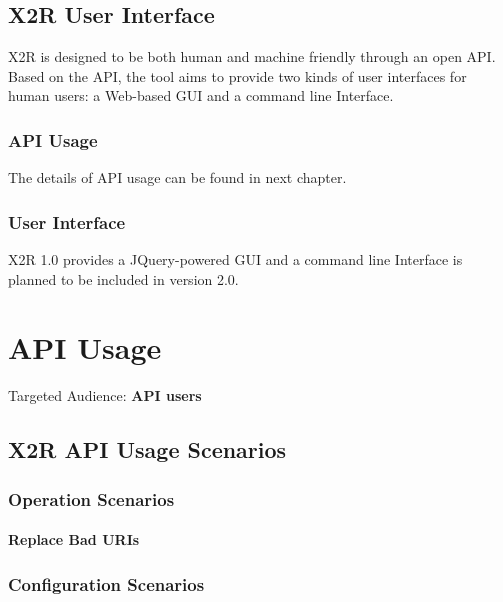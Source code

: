 \documentclass[letterpaper,10pt,english]{sphinxmanual}
\begin{document}
\section{X2R User Interface}
\label{docs/x2r:x2r-user-interface}\label{docs/x2r::doc}\label{docs/x2r:x2r}
X2R is designed to be both human and machine friendly through an open API.
Based on the API, the tool aims to provide two kinds of user interfaces for human users:
a Web-based GUI and a command line Interface.


\subsection{API Usage}
\label{docs/x2r:api-usage}
The details of API usage can be found in next chapter.


\subsection{User Interface}
\label{docs/x2r:user-interface}
X2R 1.0 provides a JQuery-powered GUI and a command line Interface is planned to be included in version 2.0.


\chapter{API Usage}
\label{index:api-usage}
Targeted Audience: \textbf{API users}


\section{X2R API Usage Scenarios}
\label{docs/scenarios/x2r:x2r-api-usage-scenarios}\label{docs/scenarios/x2r::doc}

\subsection{Operation Scenarios}
\label{docs/scenarios/x2r:operation-scenarios}

\subsubsection{Replace Bad URIs}
\label{docs/scenarios/x2r:replace-bad-uris}

\subsection{Configuration Scenarios}
\label{docs/scenarios/x2r:configuration-scenarios}
\end{document}
